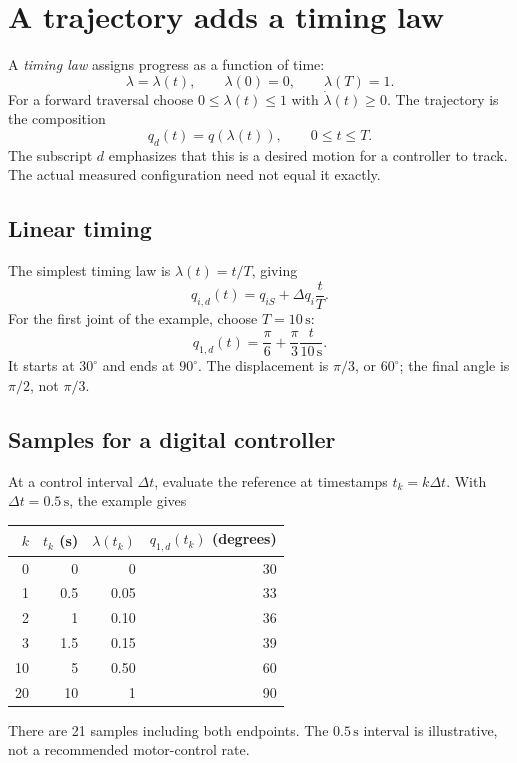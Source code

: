 \section{A trajectory adds a timing law}
A \emph{timing law} assigns progress as a function of time:
\[
 \lambda=\lambda(t),\qquad \lambda(0)=0,\qquad\lambda(T)=1.
\]
For a forward traversal choose $0\le\lambda(t)\le1$ with
$\dot\lambda(t)\ge0$. The trajectory is the composition
\begin{equation}
 q_d(t)=q(\lambda(t)),\qquad0\le t\le T.
 \label{eq:l12-trajectory}
\end{equation}
The subscript $d$ emphasizes that this is a desired motion for a controller
to track. The actual measured configuration need not equal it exactly.

\subsection{Linear timing}
The simplest timing law is $\lambda(t)=t/T$, giving
\begin{equation}
 q_{i,d}(t)=q_{iS}+\Delta q_i\frac{t}{T}.
 \label{eq:l12-linear}
\end{equation}
For the first joint of the example, choose $T=10\,\mathrm s$:
\[
 q_{1,d}(t)=\frac\pi6+\frac\pi3\frac{t}{10\,\mathrm s}.
\]
It starts at $30^\circ$ and ends at $90^\circ$. The displacement is
$\pi/3$, or $60^\circ$; the final angle is $\pi/2$, not $\pi/3$.

\subsection{Samples for a digital controller}
At a control interval $\Delta t$, evaluate the reference at timestamps
$t_k=k\Delta t$. With $\Delta t=0.5\,\mathrm s$, the example gives
\begin{center}
\begin{tabular}{rrrr}
\toprule
$k$ & $t_k$ (s) & $\lambda(t_k)$ & $q_{1,d}(t_k)$ (degrees)\\
\midrule
0 & 0 & 0 & 30\\
1 & 0.5 & 0.05 & 33\\
2 & 1 & 0.10 & 36\\
3 & 1.5 & 0.15 & 39\\
10 & 5 & 0.50 & 60\\
20 & 10 & 1 & 90\\
\bottomrule
\end{tabular}
\end{center}
There are 21 samples including both endpoints. The $0.5\,\mathrm s$
interval is illustrative, not a recommended motor-control rate.

